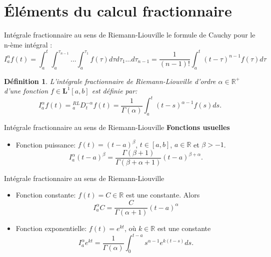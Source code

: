 \documentclass{sintefbeamer}
\newtheorem{def1}{Définition}
\begin{document}
\section{Éléments du calcul fractionnaire}

\begin{frame}{Intégrale fractionnaire au sens de Riemann-Liouville}
le formule de Cauchy pour le n-ème intégral :
\begin{equation} \label{eq:int_succ}
    I_{a}^{n} f(t) = \int_{a}^{t} \int_{a}^{\tau_{n-1}} ... \int_{a}^{\tau_1} f(\tau) d\tau d\tau_1 ... d\tau_{n-1} = \frac{1}{(n-1)!}\int_{a}^{t} (t-\tau)^{n-1} f(\tau)d\tau
\end{equation}
    \begin{def1}
         L'intégrale fractionnaire de Riemann-Liouville d'ordre $\alpha \in \mathbb{R^+}$ d'une fonction $f\in \textbf{L}^1 [a,b]$ est définie par:
    \begin{equation}\label{eq:integraleR-L}
        I_{a}^{\alpha} f(t) = {}_a^{RL} D_t^{-\alpha} f(t) =\frac{1}{\Gamma(\alpha)} \int_{a}^{t} (t-s)^{\alpha-1} f(s) ds.
    \end{equation}
    \end{def1}
\end{frame}

\begin{frame}{Intégrale fractionnaire au sens de Riemann-Liouville}
\textbf{Fonctions usuelles}
\begin{itemize}
    \item Fonction puissance: $f(t)=(t-a)^\beta$, \hspace{0.3cm} $t\in[a,b]$, \hspace{0.3cm} $a\in\mathbb{R}$ \hspace{0.3cm} et $\beta > -1$. \\
\begin{equation} \label{eq:I_R-L_fct_puissance}
    I_{a}^{\alpha} (t-a)^\beta=\frac{\Gamma(\beta +1)}{\Gamma(\beta + \alpha + 1)}(t-a)^{\beta + \alpha}.
    \end{equation}
    \end{itemize}
\end{frame}



\begin{frame}{Intégrale fractionnaire au sens de Riemann-Liouville}
    \begin{itemize}
        \item Fonction constante: $f(t) =C \in \mathbb{R}$ est une constante. Alors 
\begin{equation} \label{integral_R-L}
    I_{a}^{\alpha} C= \frac{C}{\Gamma(\alpha + 1)}(t-a)^\alpha
\end{equation}
\item Fonction exponentielle: $f(t) = e^{kt}$, où $k\in \mathbb{R}$ est une constante
\begin{equation}
    I_{a}^{\alpha} e^{kt}=\frac{1}{\Gamma(\alpha)} \int_{0}^{t-a} s^{\alpha - 1}e^{k(t-s)} ds.
\end{equation}
    \end{itemize}
\end{frame}
\end{document}
